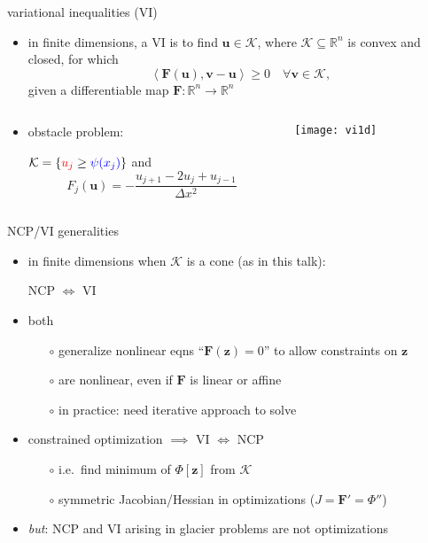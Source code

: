 \documentclass[xcolor={dvipsnames}]{beamer}
\newcommand\bu{\mathbf{u}}
\newcommand\bv{\mathbf{v}}
\newcommand\bz{\mathbf{z}}
\newcommand\bF{\mathbf{F}}
\newcommand\RR{\mathbb{R}}
\newcommand{\ip}[2]{\ensuremath{\left<#1,#2\right>}}
\begin{document}
\begin{frame}{variational inequalities (VI)}

\begin{itemize}
\item in finite dimensions, a VI is to find $\bu\in\mathcal{K}$, where $\mathcal{K}\subseteq \RR^n$ is convex and closed, for which
\begin{equation}
     \ip{\bF(\bu)}{\bv-\bu} \ge 0 \quad \forall \bv \in \mathcal{K},
\end{equation}
given a differentiable map $\bF:\RR^n \to \RR^n$
\end{itemize}

\begin{columns}
\begin{column}{0.4\textwidth}
\small
\begin{itemize}
\item obstacle problem:

$\mathcal{K} = \{{\color{red} u_j} \ge {\color{blue} \psi(x_j)}\}$ and
  $$F_j(\bu) = - \frac{u_{j+1} - 2 u_j + u_{j-1}}{\Delta x^2}$$
\end{itemize}
\end{column}
\begin{column}{0.6\textwidth}
\texttt{[image: vi1d]}
\end{column}
\end{columns}\end{frame}


\begin{frame}{NCP/VI generalities}

\begin{itemize}
\item in finite dimensions when $\mathcal{K}$ is a cone (as in this talk):
\begin{center}
\alert{NCP $\iff$ VI}
\end{center}
\item both 
  \begin{itemize}
  \item[$\circ$]  generalize nonlinear eqns ``$\bF(\bz)=0$'' to allow constraints on $\bz$
  \item[$\circ$]  are nonlinear, even if $\bF$ is linear or affine
  \item[$\circ$]  in practice: need iterative approach to solve
  \end{itemize}
\item constrained optimization $\implies$ VI $\iff$ NCP
  \begin{itemize}
  \item[$\circ$]  i.e.~find minimum of $\Phi[\bz]$ from $\mathcal{K}$
  \item[$\circ$]  symmetric Jacobian/Hessian in optimizations ($J = \bF' = \Phi''$)
  \end{itemize}
\item \emph{but}: NCP and VI arising in glacier problems are \alert{not} optimizations
\end{itemize}
\end{frame}
\end{document}

